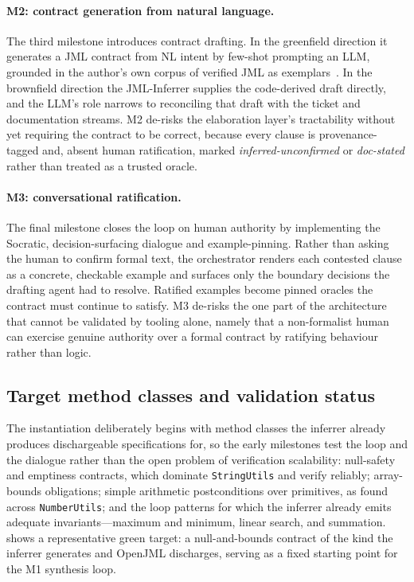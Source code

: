 \paragraph{M2: contract generation from natural language.} The third milestone introduces contract drafting. In the greenfield direction it generates a JML contract from NL intent by few-shot prompting an LLM, grounded in the author's own corpus of verified JML as exemplars~\cite{endres2024nl2postcond,ma2025specgen,cosler2023nl2spec}. In the brownfield direction the JML-Inferrer supplies the code-derived draft directly, and the LLM's role narrows to reconciling that draft with the ticket and documentation streams. M2 de-risks the elaboration layer's tractability without yet requiring the contract to be correct, because every clause is provenance-tagged and, absent human ratification, marked \emph{inferred-unconfirmed} or \emph{doc-stated} rather than treated as a trusted oracle.

\paragraph{M3: conversational ratification.} The final milestone closes the loop on human authority by implementing the Socratic, decision-surfacing dialogue and example-pinning. Rather than asking the human to confirm formal text, the orchestrator renders each contested clause as a concrete, checkable example and surfaces only the boundary decisions the drafting agent had to resolve. Ratified examples become pinned oracles the contract must continue to satisfy. M3 de-risks the one part of the architecture that cannot be validated by tooling alone, namely that a non-formalist human can exercise genuine authority over a formal contract by ratifying behaviour rather than logic.

\subsection{Target method classes and validation status}\label{subsec:a5-targets}

The instantiation deliberately begins with method classes the inferrer already produces dischargeable specifications for, so the early milestones test the loop and the dialogue rather than the open problem of verification scalability: null-safety and emptiness contracts, which dominate \texttt{StringUtils} and verify reliably; array-bounds obligations; simple arithmetic postconditions over primitives, as found across \texttt{NumberUtils}; and the loop patterns for which the inferrer already emits adequate invariants---maximum and minimum, linear search, and summation.  shows a representative green target: a null-and-bounds contract of the kind the inferrer generates and OpenJML discharges, serving as a fixed starting point for the M1 synthesis loop.

